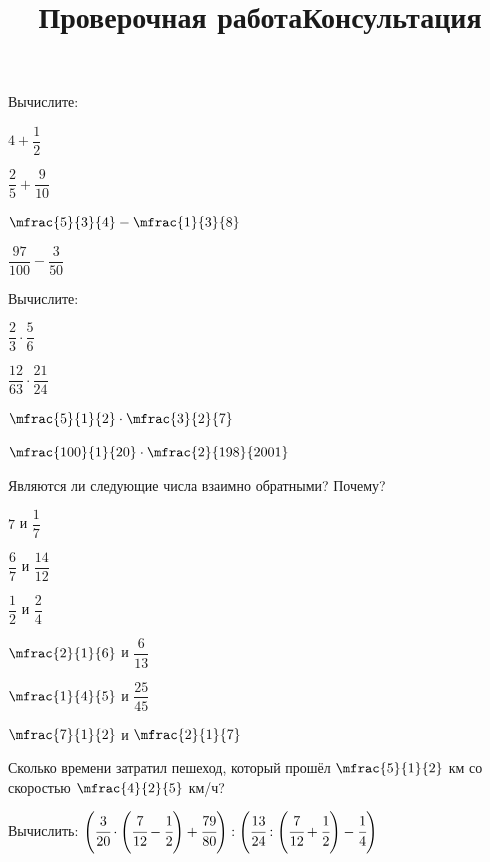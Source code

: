 \begin{exam}
	\title{Проверочная работа}
	\begin{listofex}
		\item Вычислите:
		\begin{enumcols}[itemcolumns=4]
			\item \( 4+\dfrac{1}{2} \)
			\item \( \dfrac{2}{5}+\dfrac{9}{10} \)
			\item \( \mfrac{5}{3}{4}-\mfrac{1}{3}{8} \)
			\item \( \dfrac{97}{100}-\dfrac{3}{50} \)
		\end{enumcols}
		\item Вычислите:
		\begin{enumcols}[itemcolumns=4]
			\item \( \dfrac{2}{3}\cdot\dfrac{5}{6} \)
			\item \( \dfrac{12}{63}\cdot\dfrac{21}{24} \)
			\item \( \mfrac{5}{1}{2}\cdot\mfrac{3}{2}{7} \)
			\item \( \mfrac{100}{1}{20}\cdot\mfrac{2}{198}{2001} \)
		\end{enumcols}
			\item Являются ли следующие числа взаимно обратными? Почему?
			\begin{enumcols}[itemcolumns=6]
				\item \( 7 \) и \( \dfrac{1}{7} \)
				\item \( \dfrac{6}{7} \) и \( \dfrac{14}{12} \)
				\item \( \dfrac{1}{2} \) и \( \dfrac{2}{4} \)
				\item \( \mfrac{2}{1}{6} \) и \( \dfrac{6}{13} \)
				\item \( \mfrac{1}{4}{5} \) и \( \dfrac{25}{45} \)
				\item \( \mfrac{7}{1}{2} \) и \( \mfrac{2}{1}{7} \)
			\end{enumcols}			
			\item Сколько времени затратил пешеход, который прошёл \( \mfrac{5}{1}{2} \) км со скоростью \( \mfrac{4}{2}{5} \) км/ч?
			\item Вычислить: \( \left( \cfrac{3}{20}\cdot\left( \cfrac{7}{12}-\cfrac{1}{2} \right)+\cfrac{79}{80} \right):\left( \cfrac{13}{24}:\left( \cfrac{7}{12}+\cfrac{1}{2} \right)-\cfrac{1}{4} \right) \)
	\end{listofex}
\end{exam}
		\newpage
		\title{Консультация}
